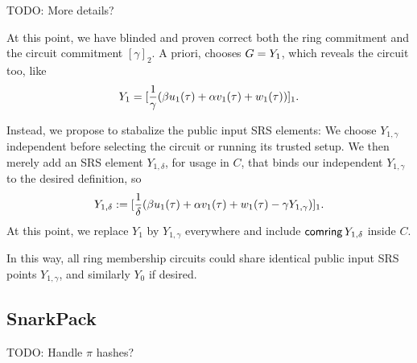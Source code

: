 TODO: More details?

At this point, we have blinded and proven correct both the
ring commitment \comring and the circuit commitment $[\gamma]_2$.
A priori, \pifast chooses $G = Y_1$, which reveals the circuit too, like
$$ Y_1 = [{1\over\gamma} (\beta u_1(\tau) + \alpha v_1(\tau) + w_1(\tau))]_1 . $$

Instead, we propose to stabalize the public input SRS elements:
We choose $Y_{1,\gamma}$ independent before selecting the circuit
 or running its trusted setup.
We then merely add an SRS element $Y_{1,\delta}$, for usage in $C$, that binds
 our independent $Y_{1,\gamma}$ to the desired definition, so
$$ Y_{1,\delta} := [{1\over\delta} (\beta u_1(\tau) + \alpha v_1(\tau) + w_1(\tau) - \gamma Y_{1,\gamma})]_1 . $$
At this point, we replace $Y_1$ by $Y_{1,\gamma}$ everywhere and
 include $\mathsf{comring} \, Y_{1,\delta}$ inside $C$.

In this way, all ring membership circuits could share identical
public input SRS points $Y_{1,\gamma}$, and similarly $Y_0$ if desired.


\subsection{SnarkPack}

TODO: Handle $\pi$ hashes?


